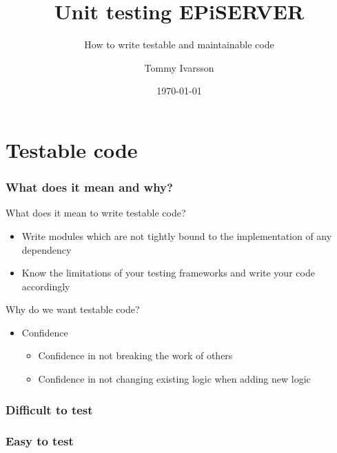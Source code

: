 \documentclass{beamer}
\title{Unit testing EPiSERVER}
\subtitle{How to write testable and maintainable code}
\author{Tommy Ivarsson}
\date{\today}
\begin{document}
	\setcounter{showProgressBar}{0}
	\setcounter{showSlideNumbers}{0}

	\frame{\titlepage}

	\setcounter{framenumber}{0}
	\setcounter{showProgressBar}{1}
	\setcounter{showSlideNumbers}{1}
	\section{Testable code}
		\begin{frame}
			\frametitle{What does it mean and why?} \pause
			\begin{exampleblock}{What does it mean to write testable code?} \pause
				\begin{itemize}
					\item Write modules which are not tightly bound to the implementation of any dependency \pause
					\item Know the limitations of your testing frameworks and write your code accordingly \pause
				\end{itemize}
			\end{exampleblock}
			\begin{exampleblock}{Why do we want testable code?} \pause
				\begin{itemize}
					\item Confidence \pause
					\begin{itemize}
						\item Confidence in not breaking the work of others \pause
						\item Confidence in not changing existing logic when adding new logic
					\end{itemize}
				\end{itemize}
			\end{exampleblock}
		\end{frame}
		\begin{frame}
			\frametitle{Difficult to test}
			
		\end{frame}
		\begin{frame}
			\frametitle{Easy to test}
			
		\end{frame}
\end{document}
